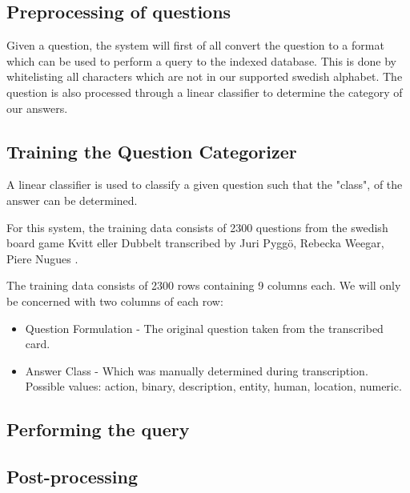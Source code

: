 \subsection{Preprocessing of questions}
Given a question, the system will first of all convert the question
to a format which can be used to perform a query to the indexed
database. This is done by whitelisting all characters which
are not in our supported swedish alphabet. The question is also
processed through a linear classifier to determine the category of our 
answers.

\subsection{Training the Question Categorizer}
A linear classifier is used to classify a given question
such that the "class", of the answer can be determined.

For this system, the training data consists of 2300 questions 
from the swedish board game Kvitt eller Dubbelt transcribed 
by Juri Pygg\"o, Rebecka Weegar, Piere Nugues \cite{QASYS}.

The training data consists of 2300 rows containing 9 columns each.
We will only be concerned with two columns of each row:
\begin{itemize}
\item Question Formulation - The original question taken from the transcribed
  card.
\item Answer Class - Which was manually determined during transcription. 
  Possible values: action, binary, description, entity, human, location, numeric.
\end{itemize}


\subsection{Performing the query}
\subsection{Post-processing}
